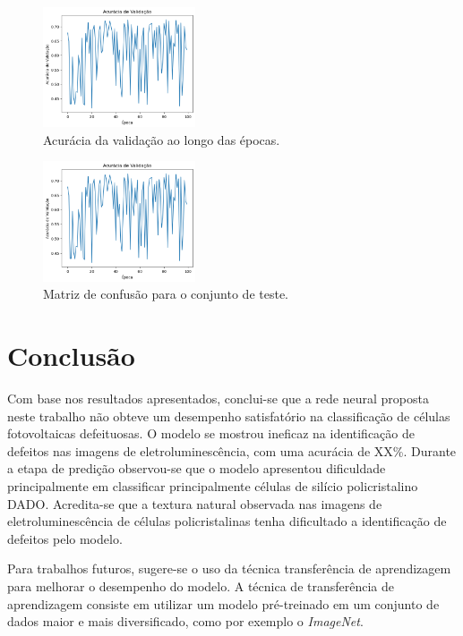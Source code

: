 \documentclass[conference]{IEEEtran}
\begin{document}
\begin{figure}[htbp]

    \centerline{\includegraphics[width=0.4\textwidth]{images/validation-accuracy.png}}
    \caption{Acurácia da validação ao longo das épocas.}
    \label{fig:validation-accuracy}
\end{figure}

\begin{figure}[htbp]

    \centerline{\includegraphics[width=0.4\textwidth]{images/validation-accuracy.png}}
    \caption{Matriz de confusão para o conjunto de teste.}
    \label{fig:confusion-matrix}
\end{figure}
\section{Conclusão}

Com base nos resultados apresentados, conclui-se que a rede neural proposta
neste
trabalho não obteve um desempenho satisfatório na classificação de células
fotovoltaicas defeituosas. O modelo se mostrou ineficaz na identificação de
defeitos nas imagens de eletroluminescência, com uma acurácia de XX\%. Durante
a etapa de predição observou-se que o modelo apresentou dificuldade
principalmente em classificar principalmente células de silício policristalino
DADO. Acredita-se que a textura natural observada nas imagens de
eletroluminescência de células policristalinas tenha dificultado a
identificação de defeitos pelo modelo.

Para trabalhos futuros, sugere-se o uso da técnica transferência de
aprendizagem para melhorar o desempenho do modelo. A técnica de transferência
de aprendizagem consiste em utilizar um modelo pré-treinado em um conjunto de
dados maior e mais diversificado, como por exemplo o \textit{ImageNet}.



\end{document}
